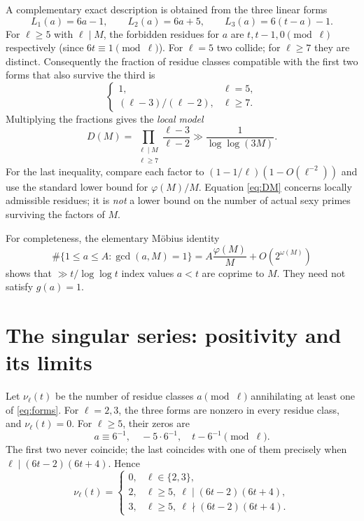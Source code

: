 \documentclass[11pt,a4paper]{article}
\theoremstyle{definition}
\begin{document}
A complementary exact description is obtained from the three linear forms
\begin{equation}\label{eq:forms}
 L_1(a)=6a-1,\qquad L_2(a)=6a+5,\qquad
 L_3(a)=6(t-a)-1.
\end{equation}
For $\ell\ge5$ with $\ell\mid M$, the forbidden residues for $a$
are $t,t-1,0\pmod\ell$ respectively (since $6t\equiv1\pmod\ell$).
For $\ell=5$ two collide; for $\ell\ge7$ they are distinct.
Consequently the fraction of residue classes compatible with the first
two forms that also survive the third is
\begin{equation}\label{eq:extfactor}
 \begin{cases}
 1,&\ell=5,\\
 (\ell-3)/(\ell-2),&\ell\ge7.
 \end{cases}
\end{equation}
Multiplying the fractions gives the \emph{local model}
\begin{equation}\label{eq:DM}
 D(M)=\prod_{\substack{\ell\mid M\\\ell\ge7}}
       \frac{\ell-3}{\ell-2}
 \gg \frac{1}{\log\log(3M)}.
\end{equation}
For the last inequality, compare each factor to
$(1-1/\ell)(1-O(\ell^{-2}))$ and use the standard lower bound for
$\varphi(M)/M$. Equation \eqref{eq:DM} concerns locally admissible
residues; it is \emph{not} a lower bound on the number of actual
sexy primes surviving the factors of $M$.

For completeness, the elementary Möbius identity
\begin{equation}\label{eq:coprime}
 \#\{1\le a\le A:\gcd(a,M)=1\}
 = A\frac{\varphi(M)}{M}+O(2^{\omega(M)})
\end{equation}
shows that $\gg t/\log\log t$ index values $a<t$ are coprime to $M$.
They need not satisfy $g(a)=1$.

\section{The singular series: positivity and its limits}

Let $\nu_\ell(t)$ be the number of residue classes $a\pmod\ell$
annihilating at least one of \eqref{eq:forms}. For $\ell=2,3$, the
three forms are nonzero in every residue class, and $\nu_\ell(t)=0$.
For $\ell\ge5$, their zeros are
\begin{equation}
 a\equiv6^{-1},\quad -5\cdot6^{-1},\quad
 t-6^{-1}\pmod\ell.
\end{equation}
The first two never coincide; the last coincides with one of them
precisely when $\ell\mid(6t-2)(6t+4)$.
Hence
\begin{equation}\label{eq:nu}
 \nu_\ell(t)=
 \begin{cases}
 0,&\ell\in\{2,3\},\\
 2,&\ell\ge5,\ \ell\mid(6t-2)(6t+4),\\
 3,&\ell\ge5,\ \ell\nmid(6t-2)(6t+4).
 \end{cases}
\end{equation}
\end{document}
